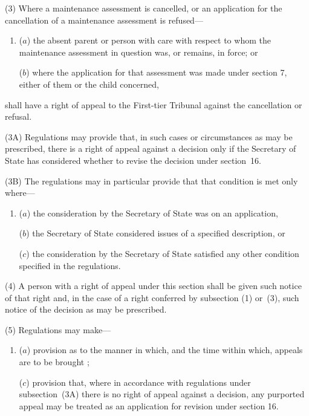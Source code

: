 \documentclass[12pt,a4paper]{article}
\begin{document}
(3) Where a maintenance assessment is cancelled, or an application for the cancellation of a maintenance assessment is refused—
\begin{enumerate}\item[]
($a$) the absent parent or person with care with respect to whom the maintenance assessment in question was, or remains, in force; or

($b$) where the application for that assessment was made under section 7, either of them or the child concerned,
\end{enumerate}
shall have a right of appeal to 
the First-tier Tribunal  %
against the cancellation or refusal.

(3A) Regulations may provide that, in such cases or circumstances as may be prescribed, there is a right of appeal against a decision only if the 
Secretary of State  %
has considered whether to revise the decision under section~16.

(3B) The regulations may in particular provide that that condition is met only where—
\begin{enumerate}\item[]
($a$) the consideration by the 
Secretary of State  %
was on an application,

($b$) the 
Secretary of State  %
considered issues of a specified description, or

($c$) the consideration by the 
Secretary of State  %
satisfied any other condition specified in the regulations.
\end{enumerate}

(4) A person with a right of appeal under this section shall be given such notice of that right and, in the case of a right conferred by subsection (1) or~(3), such notice of the decision as may be prescribed.

(5) Regulations may make—
\begin{enumerate}\item[]
($a$) provision as to the manner in which, and the time within which, appeals are to be brought%
%
;

($c$) provision that, where in accordance with regulations under subsection~(3A) there is no right of appeal against a decision, any purported appeal may be treated as an application for revision under section 16.
\end{enumerate}
\end{document}
